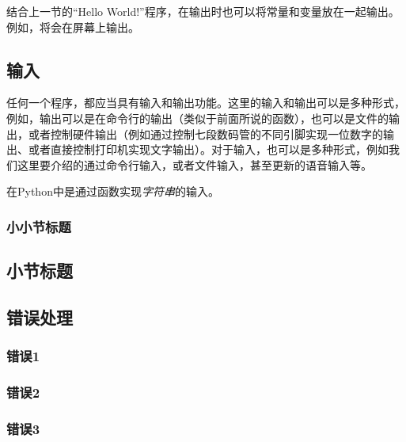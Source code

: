 结合上一节的“Hello World!”程序，在输出时也可以将常量和变量放在一起输出。例如，将会在屏幕上输出。

\subsection{输入}\label{subsec:输入与输出-input输入}

任何一个程序，都应当具有输入和输出功能。这里的输入和输出可以是多种形式，例如，输出可以是在命令行的输出（类似于前面所说的函数），也可以是文件的输出，或者控制硬件输出（例如通过控制七段数码管的不同引脚实现一位数字的输出、或者直接控制打印机实现文字输出）。对于输入，也可以是多种形式，例如我们这里要介绍的通过命令行输入，或者文件输入，甚至更新的语音输入等。

在Python中是通过函数实现\emph{字符串}的输入。



\subsubsection{小小节标题}

\subsection{小节标题}\label{subsec:节标题-小节标题}


\subsection{错误处理}\label{subsec:节标题-错误处理}

\subsubsection{错误1}

\subsubsection{错误2}

\subsubsection{错误3}